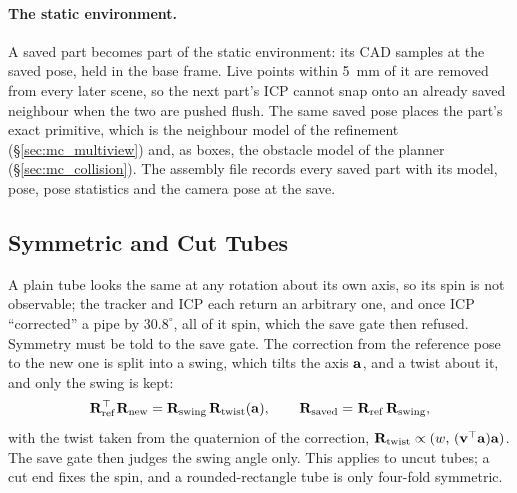 \paragraph{The static environment.} A saved part becomes part of the static environment: its CAD
samples at the saved pose, held in the base frame. Live points within 5~mm of it are removed from
every later scene, so the next part's ICP cannot snap onto an already saved neighbour when the two
are pushed flush. The same saved pose places the part's exact primitive, which is the neighbour model
of the refinement (\S\ref{sec:mc_multiview}) and, as boxes, the obstacle model of the planner
(\S\ref{sec:mc_collision}). The assembly file records every saved part with its model, pose, pose
statistics and the camera pose at the save.

\subsection{Symmetric and Cut Tubes}
\label{sec:per_symmetry}
A plain tube looks the same at any rotation about its own axis, so its spin is not observable; the
tracker and ICP each return an arbitrary one, and once ICP ``corrected'' a pipe by $30.8^\circ$, all
of it spin, which the save gate then refused. Symmetry must be told to the save gate. The correction from the reference pose to the new
one is split into a swing, which tilts the axis $\mathbf{a}$, and a twist about it, and only the swing
is kept:
\begin{equation}
{}^{}\mathbf{R}_{\mathrm{ref}}^{\top}{}^{}\mathbf{R}_{\mathrm{new}} = \mathbf{R}_{\mathrm{swing}}\,\mathbf{R}_{\mathrm{twist}}(\mathbf{a}),
\qquad {}^{}\mathbf{R}_{\mathrm{saved}} = {}^{}\mathbf{R}_{\mathrm{ref}}\,\mathbf{R}_{\mathrm{swing}},
\label{eq:swing_twist}
\end{equation}
with the twist taken from the quaternion of the correction, $\mathbf{R}_{\mathrm{twist}}\propto(w,\,(\mathbf{v}^{\top}\mathbf{a})\mathbf{a})$.
The save gate then judges the swing angle only. This applies to uncut tubes; a cut end fixes the
spin, and a rounded-rectangle tube is only four-fold symmetric.

